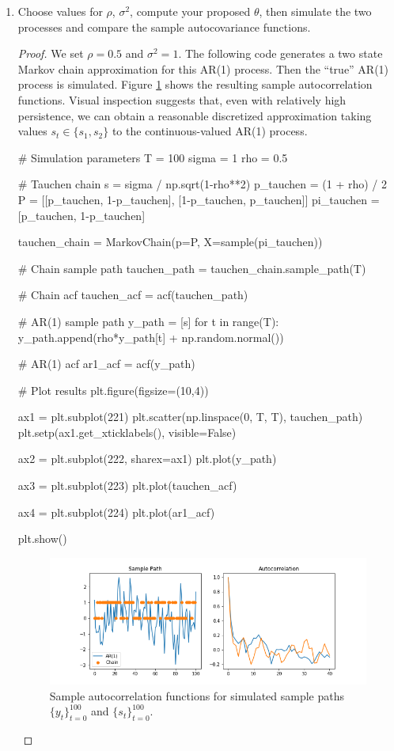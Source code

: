 \documentclass[oneside,reqno]{amsart}
\theoremstyle{definition}
\begin{document}
\begin{enumerate}[label=(\roman*)]
\begin{proof}
\begin{align*}
\end{align*}
the desired result.
\end{proof}
\item
Choose values for $\rho$, $\sigma^2$, compute your proposed $\theta$, then simulate the two processes and compare the sample autocovariance functions.
\begin{proof} 
We set $\rho = 0.5$ and $\sigma^2=1$. The following code generates a two state Markov chain approximation for this AR(1) process. Then the ``true'' AR(1) process is simulated. Figure \ref{markov-ar1-acf-fig} shows the resulting sample autocorrelation functions. Visual inspection suggests that, even with relatively high persistence, we can obtain a reasonable discretized approximation taking values $s_t \in \{s_1, s_2\}$ to the continuous-valued AR(1) process.
\begin{python3code}
# Simulation parameters 
T = 100
sigma = 1
rho = 0.5

# Tauchen chain
s = sigma / np.sqrt(1-rho**2)
p_tauchen = (1 + rho) / 2
P = [[p_tauchen, 1-p_tauchen], [1-p_tauchen, p_tauchen]]
pi_tauchen = [p_tauchen, 1-p_tauchen]

tauchen_chain = MarkovChain(p=P, X=sample(pi_tauchen))

# Chain sample path
tauchen_path = tauchen_chain.sample_path(T)

# Chain acf
tauchen_acf = acf(tauchen_path)

# AR(1) sample path
y_path = [s]
for t in range(T):
    y_path.append(rho*y_path[t] + np.random.normal())

# AR(1) acf
ar1_acf = acf(y_path)

# Plot results 
plt.figure(figsize=(10,4))

ax1 = plt.subplot(221)
plt.scatter(np.linspace(0, T, T), tauchen_path)
plt.setp(ax1.get_xticklabels(), visible=False)

ax2 = plt.subplot(222, sharex=ax1)
plt.plot(y_path)

ax3 = plt.subplot(223)
plt.plot(tauchen_acf)

ax4 = plt.subplot(224)
plt.plot(ar1_acf)

plt.show()
\end{python3code}

\begin{figure}
\includegraphics[width=\textwidth]{q1-sim}
\caption{Sample autocorrelation functions for simulated sample paths $\{y_t\}_{t=0}^{100}$ and $\{s_t\}_{t=0}^{100}$.}
\label{markov-ar1-acf-fig}
\end{figure}


\end{proof}
\end{enumerate}
\end{document}
